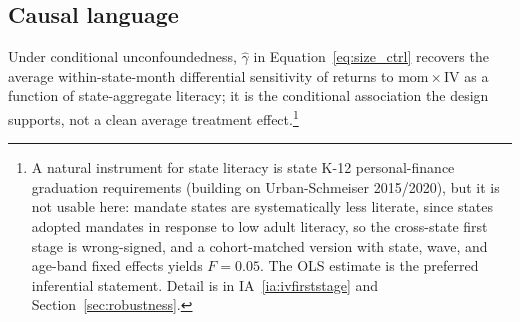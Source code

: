 \subsection{Causal language}

Under conditional unconfoundedness, $\hat\gamma$ in Equation~\eqref{eq:size_ctrl} recovers the average within-state-month differential sensitivity of returns to $\mathrm{mom}\times\mathrm{IV}$ as a function of state-aggregate literacy; it is the conditional association the design supports, not a clean average treatment effect.\footnote{A natural instrument for state literacy is state K-12 personal-finance graduation requirements (building on Urban-Schmeiser 2015/2020), but it is not usable here: mandate states are systematically less literate, since states adopted mandates in response to low adult literacy, so the cross-state first stage is wrong-signed, and a cohort-matched version with state, wave, and age-band fixed effects yields $F = 0.05$. The OLS estimate is the preferred inferential statement. Detail is in IA~\ref{ia:ivfirststage} and Section~\ref{sec:robustness}.}
